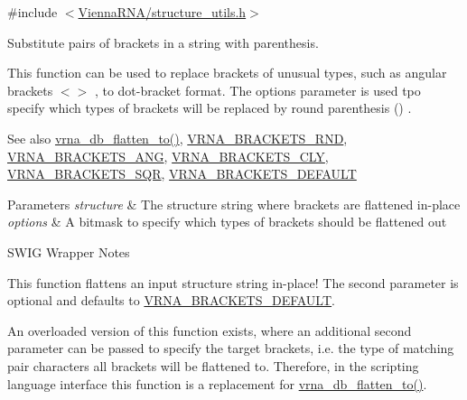 {\ttfamily \#include $<$\mbox{\hyperlink{structure__utils_8h}{Vienna\+R\+N\+A/structure\+\_\+utils.\+h}}$>$}



Substitute pairs of brackets in a string with parenthesis. 

This function can be used to replace brackets of unusual types, such as angular brackets  $<$$>$  , to dot-\/bracket format. The {\ttfamily options} parameter is used tpo specify which types of brackets will be replaced by round parenthesis  () .

\begin{DoxySeeAlso}{See also}
\mbox{\hyperlink{group__struct__utils_ga690425199c8b71545e7196e3af1436f8}{vrna\+\_\+db\+\_\+flatten\+\_\+to()}}, \mbox{\hyperlink{group__struct__utils_gac92d5fa7c6625bce2670ece510a24fbd}{V\+R\+N\+A\+\_\+\+B\+R\+A\+C\+K\+E\+T\+S\+\_\+\+R\+ND}}, \mbox{\hyperlink{group__struct__utils_ga863e03f7f73f10fc9bbcbefbdda4bec8}{V\+R\+N\+A\+\_\+\+B\+R\+A\+C\+K\+E\+T\+S\+\_\+\+A\+NG}}, \mbox{\hyperlink{group__struct__utils_gaf41be40e79cb756c4e0bb8edb4d803d2}{V\+R\+N\+A\+\_\+\+B\+R\+A\+C\+K\+E\+T\+S\+\_\+\+C\+LY}}, \mbox{\hyperlink{group__struct__utils_ga60525d61d7496eeea490a37f3d6bf757}{V\+R\+N\+A\+\_\+\+B\+R\+A\+C\+K\+E\+T\+S\+\_\+\+S\+QR}}, \mbox{\hyperlink{group__struct__utils_ga559ebf76b1b289f85309f4206e99aa1a}{V\+R\+N\+A\+\_\+\+B\+R\+A\+C\+K\+E\+T\+S\+\_\+\+D\+E\+F\+A\+U\+LT}}
\end{DoxySeeAlso}

\begin{DoxyParams}{Parameters}
{\em structure} & The structure string where brackets are flattened in-\/place \\
\hline
{\em options} & A bitmask to specify which types of brackets should be flattened out\\
\hline
\end{DoxyParams}
\begin{DoxyRefDesc}{S\+W\+I\+G Wrapper Notes}
\item[\mbox{\hyperlink{wrappers__wrappers000088}{S\+W\+I\+G Wrapper Notes}}]This function flattens an input structure string in-\/place! The second parameter is optional and defaults to \mbox{\hyperlink{group__struct__utils_ga559ebf76b1b289f85309f4206e99aa1a}{V\+R\+N\+A\+\_\+\+B\+R\+A\+C\+K\+E\+T\+S\+\_\+\+D\+E\+F\+A\+U\+LT}}.

An overloaded version of this function exists, where an additional second parameter can be passed to specify the target brackets, i.\+e. the type of matching pair characters all brackets will be flattened to. Therefore, in the scripting language interface this function is a replacement for \mbox{\hyperlink{group__struct__utils_ga690425199c8b71545e7196e3af1436f8}{vrna\+\_\+db\+\_\+flatten\+\_\+to()}}. \end{DoxyRefDesc}
\mbox{\label{group__struct__utils_ga690425199c8b71545e7196e3af1436f8}} 
